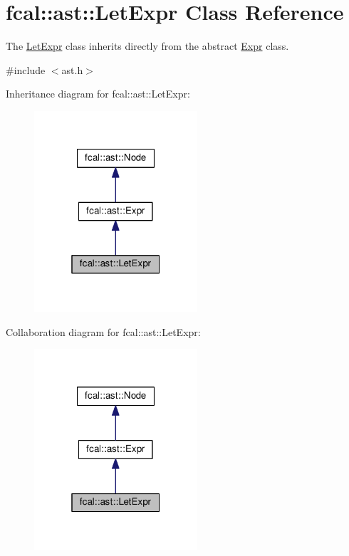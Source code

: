 \hypertarget{classfcal_1_1ast_1_1LetExpr}{}\section{fcal\+:\+:ast\+:\+:Let\+Expr Class Reference}
\label{classfcal_1_1ast_1_1LetExpr}


The \hyperlink{classfcal_1_1ast_1_1LetExpr}{Let\+Expr} class inherits directly from the abstract \hyperlink{classfcal_1_1ast_1_1Expr}{Expr} class.  




{\ttfamily \#include $<$ast.\+h$>$}



Inheritance diagram for fcal\+:\+:ast\+:\+:Let\+Expr\+:
\nopagebreak
\begin{figure}[H]
\begin{center}
\leavevmode
\includegraphics[width=172pt]{classfcal_1_1ast_1_1LetExpr__inherit__graph}
\end{center}
\end{figure}


Collaboration diagram for fcal\+:\+:ast\+:\+:Let\+Expr\+:
\nopagebreak
\begin{figure}[H]
\begin{center}
\leavevmode
\includegraphics[width=172pt]{classfcal_1_1ast_1_1LetExpr__coll__graph}
\end{center}
\end{figure}
